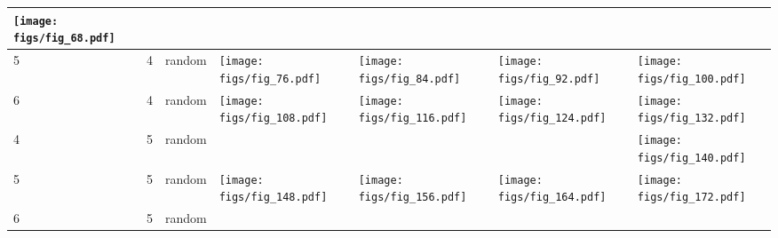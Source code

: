 \documentclass[oneside,canadian,landscape]{article}
\begin{document}
\begin{center}
\begin{longtable}{|l|l|l||l|l|l|l|}
\begin{minipage}{3.5cm}
\texttt{[image: figs/fig\_68.pdf]}
\end{minipage}
&\\ \hline
5&4&random&\begin{minipage}{3.5cm}
\texttt{[image: figs/fig\_76.pdf]}
\end{minipage}
&\begin{minipage}{3.5cm}
\texttt{[image: figs/fig\_84.pdf]}
\end{minipage}
&\begin{minipage}{3.5cm}
\texttt{[image: figs/fig\_92.pdf]}
\end{minipage}
&\begin{minipage}{3.5cm}
\texttt{[image: figs/fig\_100.pdf]}
\end{minipage}
\\ \hline
6&4&random&\begin{minipage}{3.5cm}
\texttt{[image: figs/fig\_108.pdf]}
\end{minipage}
&\begin{minipage}{3.5cm}
\texttt{[image: figs/fig\_116.pdf]}
\end{minipage}
&\begin{minipage}{3.5cm}
\texttt{[image: figs/fig\_124.pdf]}
\end{minipage}
&\begin{minipage}{3.5cm}
\texttt{[image: figs/fig\_132.pdf]}
\end{minipage}
\\ \hline
4&5&random&&&&\begin{minipage}{3.5cm}
\texttt{[image: figs/fig\_140.pdf]}
\end{minipage}
\\ \hline
5&5&random&\begin{minipage}{3.5cm}
\texttt{[image: figs/fig\_148.pdf]}
\end{minipage}
&\begin{minipage}{3.5cm}
\texttt{[image: figs/fig\_156.pdf]}
\end{minipage}
&\begin{minipage}{3.5cm}
\texttt{[image: figs/fig\_164.pdf]}
\end{minipage}
&\begin{minipage}{3.5cm}
\texttt{[image: figs/fig\_172.pdf]}
\end{minipage}
\\ \hline
6&5&random&&\begin{minipage}{3.5cm}

\end{minipage}
\end{longtable}
\end{center}
\end{document}
